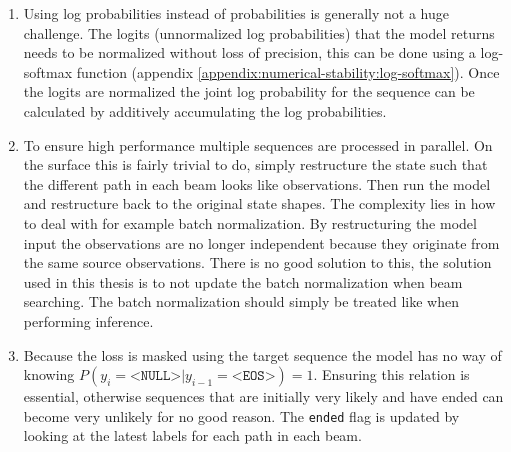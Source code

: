 \begin{enumerate}
\item Using log probabilities instead of probabilities is generally not a huge challenge. The logits (unnormalized log probabilities) that the model returns needs to be normalized without loss of precision, this can be done using a log-softmax function (appendix \ref{appendix:numerical-stability:log-softmax}). Once the logits are normalized the joint log probability for the sequence can be calculated by additively accumulating the log probabilities.

\item To ensure high performance multiple sequences are processed in parallel. On the surface this is fairly trivial to do, simply restructure the state such that the different path in each beam looks like observations. Then run the model and restructure back to the original state shapes. The complexity lies in how to deal with for example batch normalization. By restructuring the model input the observations are no longer independent because they originate from the same source observations. There is no good solution to this, the solution used in this thesis is to not update the batch normalization when beam searching. The batch normalization should simply be treated like when performing inference.

\item Because the loss is masked using the target sequence the model has no way of knowing $P(y_i = \texttt{<NULL>} | y_{i-1} = \texttt{<EOS>}) = 1$. Ensuring this relation is essential, otherwise sequences that are initially very likely and have ended can become very unlikely for no good reason. The \texttt{ended} flag is updated by looking at the latest labels for each path in each beam.
\end{enumerate}
